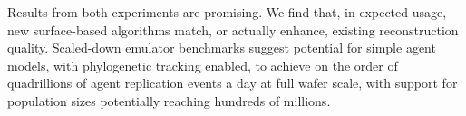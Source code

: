 Results from both experiments are promising.
We find that, in expected usage, new surface-based algorithms match, or actually enhance, existing reconstruction quality.
Scaled-down emulator benchmarks suggest potential for simple agent models, with phylogenetic tracking enabled, to achieve on the order of quadrillions of agent replication events a day at full wafer scale, with support for population sizes potentially reaching hundreds of millions.




